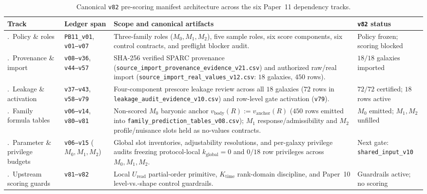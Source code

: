 \documentclass[11pt]{article}
\begin{document}
\begin{table}[ht!]
\centering
\caption{Canonical \texttt{v82} pre-scoring manifest architecture across the six Paper~11 dependency tracks.}
\label{tab:v82-architecture}
\footnotesize
\renewcommand{\arraystretch}{1.18}
\begin{tabularx}{\textwidth}{@{}>{\raggedright\arraybackslash}p{2.5cm} >{\raggedright\arraybackslash}p{2.3cm} >{\raggedright\arraybackslash}X >{\raggedright\arraybackslash}p{2.7cm}@{}}
\toprule
\textbf{Track} & \textbf{Ledger span} & \textbf{Scope and canonical artifacts} & \textbf{\texttt{v82} status} \\
\midrule
1.\ Policy \& roles & \texttt{PB11\_v01}, \texttt{v01--v07} & Three-family roles ($M_0,M_1,M_2$), five sample roles, six score components, six control contracts, and preflight blocker audit. & Policy frozen; scoring blocked \\
2.\ Provenance \& import & \texttt{v08--v36}, \texttt{v44--v57} & SHA-256 verified SPARC provenance (\texttt{source\_\allowbreak{}import\_\allowbreak{}provenance\_\allowbreak{}evidence\_\allowbreak{}v21.csv}) and authorized raw/real import (\texttt{source\_\allowbreak{}import\_\allowbreak{}real\_\allowbreak{}values\_\allowbreak{}v12.csv}: $18$ galaxies, $450$ rows). & $18/18$ galaxies imported \\
3.\ Leakage \& activation & \texttt{v37--v43}, \texttt{v58--v79} & Four-component prescore leakage review across all $18$ galaxies ($72$ rows in \texttt{leakage\_\allowbreak{}audit\_\allowbreak{}evidence\_\allowbreak{}v10.csv}) and row-level gate activation (\texttt{v79}). & $72/72$ certified; $18$ rows active \\
4.\ Family formula tables & \texttt{v06--v14}, \texttt{v80--v81} & Non-scored $M_0$ baryonic anchor $v_{\mathrm{body}}(R):=v_{\mathrm{anchor}}(R)$ ($450$ rows emitted into \texttt{family\_\allowbreak{}prediction\_\allowbreak{}tables\_\allowbreak{}v08.csv}); $M_1$ response/admissibility and $M_2$ profile/nuisance slots held as no-values contracts. & $M_0$ emitted; $M_1,M_2$ unfilled \\
5.\ Parameter \& privilege budgets & \texttt{v06--v15} ($M_0,M_1,M_2$) & Global slot inventories, adjustability resolutions, and per-galaxy privilege audits freezing protocol-local $k_{\mathrm{global}}=0$ and $0/18$ row privileges across $M_0,M_1,M_2$. & Next gate: \texttt{shared\_\allowbreak{}input\_\allowbreak{}v10} \\
6.\ Upstream scoring guards & \texttt{v81--v82} & Local $U_{\mathrm{read}}$ partial-order primitive, $K_{\mathrm{time}}$ rank-domain discipline, and Paper~10 level-vs.-shape control guardrails. & Guardrails active; no scoring \\
\bottomrule
\end{tabularx}
\end{table}
\end{document}
